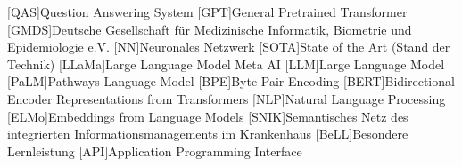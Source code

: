 \begin{acronym}[SPARQL]
    [QAS]{Question Answering System}
    [GPT]{General Pretrained Transformer}
    [GMDS]{Deutsche Gesellschaft für Medizinische Informatik, Biometrie und Epidemiologie e.V.}
    [NN]{Neuronales Netzwerk}
    [SOTA]{State of the Art (Stand der Technik)}
    [LLaMa]{Large Language Model Meta AI}
    [LLM]{Large Language Model}
    [PaLM]{Pathways Language Model}
    [BPE]{Byte Pair Encoding}
    [BERT]{Bidirectional Encoder Representations from Transformers}
    [NLP]{Natural Language Processing}
    [ELMo]{Embeddings from Language Models}
    [SNIK]{Semantisches Netz des integrierten Informationsmanagements im Krankenhaus}
    [BeLL]{Besondere Lernleistung}
    [API]{Application Programming Interface}
\end{acronym}
